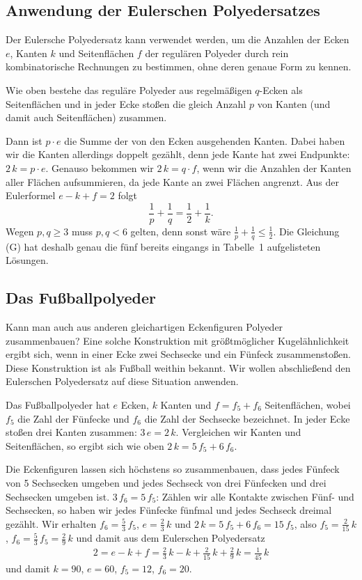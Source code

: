 \documentclass[11pt]{article}
\begin{document}
\subsection*{Anwendung der Eulerschen Polyedersatzes}

Der Eulersche Polyedersatz kann verwendet werden, um die Anzahlen der Ecken
$e$, Kanten $k$ und Seitenflächen $f$ der regulären Polyeder durch rein
kombinatorische Rechnungen zu bestimmen, ohne deren genaue Form zu kennen.

Wie oben bestehe das reguläre Polyeder aus regelmäßigen $q$-Ecken als
Seitenflächen und in jeder Ecke stoßen die gleich Anzahl $p$ von Kanten (und
damit auch Seitenflächen) zusammen.

Dann ist $p\cdot e$ die Summe der von den Ecken ausgehenden Kanten. Dabei
haben wir die Kanten allerdings doppelt gezählt, denn jede Kante hat zwei
Endpunkte: $2\,k = p\cdot e$. Genauso bekommen wir $2\,k = q\cdot f$, wenn wir
die Anzahlen der Kanten aller Flächen aufsummieren, da jede Kante an zwei
Flächen angrenzt. Aus der Eulerformel $e-k+f=2$ folgt 
\[\frac{1}{p} + \frac{1}{q} =  \frac12 +\frac{1}{k}. \tag{G}\]
Wegen $p,q\ge 3$ muss $p,q<6$ gelten, denn sonst wäre $\frac{1}{p} +
\frac{1}{q} \le \frac12$.  Die Gleichung (G) hat deshalb genau die fünf
bereits eingangs in Tabelle~1 aufgelisteten Lösungen.

\subsection*{Das Fußballpolyeder}

Kann man auch aus anderen gleichartigen Eckenfiguren Polyeder zusammenbauen?
Eine solche Konstruktion mit größtmöglicher Kugelähnlichkeit ergibt sich, wenn
in einer Ecke zwei Sechsecke und ein Fünfeck zusammenstoßen.  Diese
Konstruktion ist als Fußball weithin bekannt. Wir wollen abschließend den
Eulerschen Polyedersatz auf diese Situation anwenden.

Das Fußballpolyeder hat $e$ Ecken, $k$ Kanten und $f=f_5+f_6$ Seitenflächen,
wobei $f_5$ die Zahl der Fünfecke und $f_6$ die Zahl der Sechsecke bezeichnet.
In jeder Ecke stoßen drei Kanten zusammen: $3\,e=2\,k$.  Vergleichen wir
Kanten und Seitenflächen, so ergibt sich wie oben $2\,k=5\,f_5+6\,f_6$.

Die Eckenfiguren lassen sich höchstens so zusammenbauen, dass jedes Fünfeck
von 5 Sechsecken umgeben und jedes Sechseck von drei Fünfecken und drei
Sechsecken umgeben ist.  $3\,f_6=5\,f_5$: Zählen wir alle Kontakte zwischen
Fünf- und Sechsecken, so haben wir jedes Fünfecke fünfmal und jedes Sechseck
dreimal gezählt.  Wir erhalten $f_6=\frac53\,f_5$, $e=\frac23\,k$ und
$2\,k=5\,f_5+6\,f_6=15\,f_5$, also $f_5=\frac{2}{15}\,k$,
$f_6=\frac53\,f_5=\frac{2}{9}\,k$ und damit aus dem Eulerschen Polyedersatz
\begin{gather*}
  2=e-k+f=\frac23\,k-k+\frac{2}{15}\,k+\frac{2}{9}\,k=\frac{1}{45}\,k
\end{gather*}
und damit $k=90$, $e=60$, $f_5=12$, $f_6=20$. 
\end{document}
